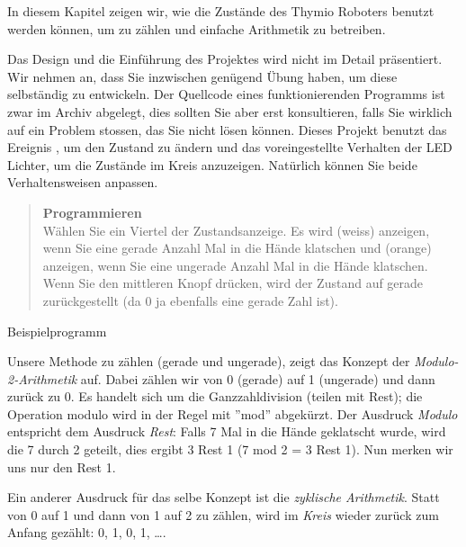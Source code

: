 \label{ch.counting}

In diesem Kapitel zeigen wir, wie die Zustände des Thymio Roboters benutzt werden können, um zu zählen und einfache Arithmetik zu betreiben.

Das Design und die Einführung des Projektes wird nicht im Detail präsentiert. Wir nehmen an, dass Sie inzwischen genügend Übung haben, um diese selbständig zu entwickeln. Der Quellcode eines funktionierenden Programms ist zwar im Archiv abgelegt, dies sollten Sie aber erst konsultieren, falls Sie wirklich auf ein Problem stossen, das Sie nicht lösen können.
Dieses Projekt benutzt das Ereignis , um den Zustand zu ändern und 
das voreingestellte Verhalten der LED Lichter, um die Zustände im Kreis anzuzeigen. Natürlich können Sie beide Verhaltensweisen anpassen.




\begin{quote}
	\textbf{Programmieren}\\Wählen Sie ein Viertel der Zustandsanzeige. Es wird  (weiss) anzeigen, wenn Sie eine gerade Anzahl Mal in die Hände klatschen und  (orange) anzeigen, wenn Sie eine ungerade Anzahl Mal in die Hände klatschen. 
	Wenn Sie den mittleren Knopf drücken, wird der Zustand auf gerade zurückgestellt (da 0 ja ebenfalls eine gerade Zahl ist).
\end{quote}

{\raggedleft \hfill Beispielprogramm }

Unsere Methode zu zählen (gerade und ungerade), zeigt das Konzept der \emph{Modulo-2-Arithmetik} auf. Dabei zählen wir von 0 (gerade) auf 1 (ungerade) und dann zurück zu 0. Es handelt sich um die Ganzzahldivision (teilen mit Rest); die Operation modulo wird in der Regel mit ''mod'' abgekürzt. Der Ausdruck \emph{Modulo} entspricht dem Ausdruck \emph{Rest}: Falls 7 Mal in die Hände geklatscht wurde, wird die 7 durch 2 geteilt, dies ergibt 3 Rest 1 (7 mod 2 = 3 Rest 1). Nun merken wir uns nur den Rest 1. 

Ein anderer Ausdruck für das selbe Konzept ist die \emph{zyklische Arithmetik}. Statt von 0 auf 1 und dann von 1 auf 2 zu zählen, wird im \emph{Kreis} wieder zurück zum Anfang gezählt: 0, 1, 0, 1, \ldots.

